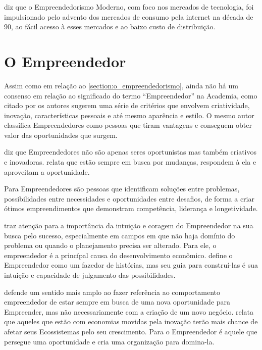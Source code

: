  diz que o Empreendedorismo Moderno, com foco nos mercados de tecnologia, foi impulsionado pelo advento dos mercados de consumo pela internet na década de 90, ao fácil acesso à esses mercados e ao baixo custo de distribuição.

\section{O Empreendedor}
\label{section:o_empreendedor}

Assim como em relação ao \ref{section:o_empreendedorismo}, ainda não há um consenso em relação ao significado do termo ``Empreendedor'' na Academia, como citado por  os autores sugerem uma série de critérios que envolvem criatividade, inovação, características pessoais e até mesmo aparência e estilo. O mesmo autor classifica Empreendedores como pessoas que tiram vantagens e conseguem obter valor das oportunidades que surgem.

 diz que Empreendedores não são apenas seres oportunistas mas também criativos e inovadoras.  relata que estão sempre em busca por mudanças, respondem à ela e aproveitam a oportunidade.

Para  Empreendedores são pessoas que identificam soluções entre problemas, possibilidades entre necessidades e oportunidades entre desafios, de forma a criar ótimos empreendimentos que demonstram competência, liderança e longetividade. 

 traz atenção para a importância da intuição e coragem do Empreendedor na sua busca pelo sucesso, especialmente em campos em que não haja domínio do problema ou quando o planejamento precisa ser alterado. Para ele, o empreendedor é a princípal causa do desenvolvimento econômico.  define o Empreendedor como um fazedor de histórias, mas seu guia para construí-las é sua intuição e capacidade de julgamento das possibilidades.

 defende um sentido mais amplo ao fazer referência ao comportamento empreendedor de estar sempre em busca de uma nova oportunidade para Empreender, mas não necessariamente com a criação de um novo negócio.  relata que aqueles que estão com economias movidas pela inovação terão mais chance de afetar seus Ecossistemas pelo seu crescimento. Para  o Empreendedor é aquele que persegue uma oportunidade e cria uma organização para domina-la.


